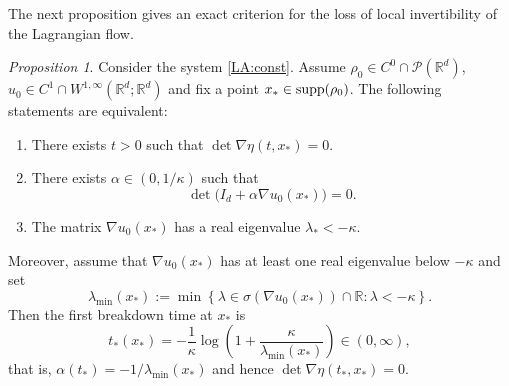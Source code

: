 \documentclass[11pt]{amsart}
\numberwithin{equation}{section}
\newtheorem{proposition}[theorem]{Proposition}
\theoremstyle{definition}
\theoremstyle{remark}
\numberwithin{equation}{section}
\newtheorem{proposition}[theorem]{Proposition}
\newcommand{\R}{\mathbb R}
\newcommand{\lt}{\left}
\newcommand{\rt}{\right}
\newcommand{\calP}{\mathcal P}
\newcommand{\supp}{{\rm supp}}
\begin{document}
The next proposition gives an exact criterion for the loss of local invertibility of the Lagrangian flow.

\begin{proposition} \label{prop:const-break}
Consider the system \eqref{LA:const}. Assume $\rho_0\in C^0\cap\calP(\R^d)$,  $u_0\in C^1 \cap W^{1,\infty}(\R^d;\R^d)$ and fix a point $x_*\in\supp(\rho_0)$.
The following statements are equivalent:
\begin{enumerate}
\item[\rm (i)] There exists $t>0$ such that $\det\nabla\eta(t,x_*)=0$.
\item[\rm (ii)] There exists $\alpha\in(0,1/\kappa)$ such that
\[
\det\big(I_d+\alpha\nabla u_0(x_*)\big)=0.
\]
\item[\rm (iii)] The matrix $\nabla u_0(x_*)$ has a real eigenvalue $\lambda_*<-\kappa$.
\end{enumerate}

Moreover, assume that $\nabla u_0(x_*)$ has at least one real eigenvalue below $-\kappa$ and set
\[
\lambda_{\min}(x_*):=\min\lt\{\lambda\in\sigma(\nabla u_0(x_*))\cap\R: \lambda<-\kappa\rt\}.
\]
Then the first breakdown time at $x_*$ is
\[
t_*(x_*)
= -\frac1\kappa \log\lt(1+ \frac{\kappa}{\lambda_{\min}(x_*)}\rt)\in(0,\infty),
\]
that is, $\alpha(t_*)=-1/\lambda_{\min}(x_*)$ and hence $\det\nabla\eta(t_*,x_*)=0$.
\end{proposition}
\end{document}
